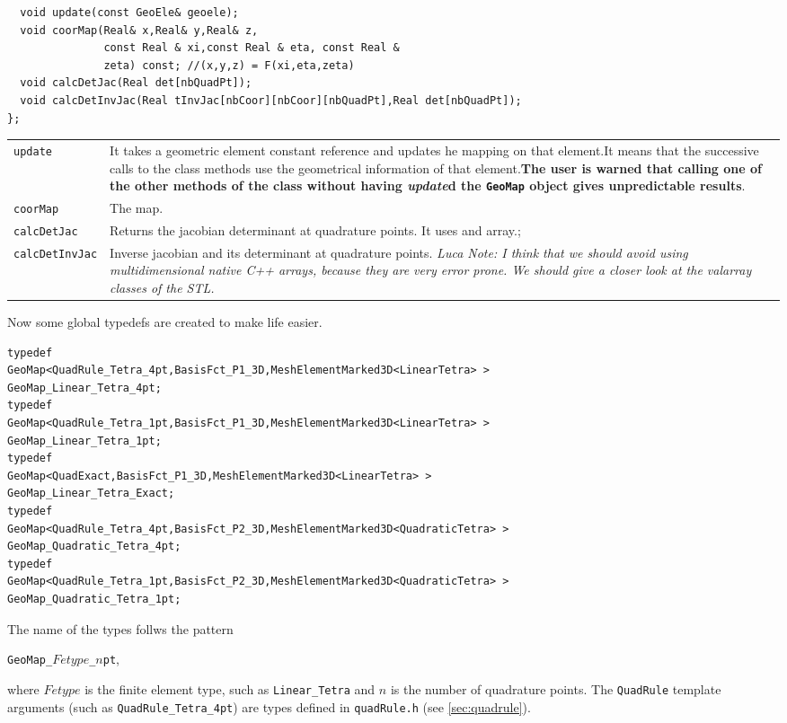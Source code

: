 \begin{verbatim}
  void update(const GeoEle& geoele);
  void coorMap(Real& x,Real& y,Real& z,
               const Real & xi,const Real & eta, const Real &
               zeta) const; //(x,y,z) = F(xi,eta,zeta)
  void calcDetJac(Real det[nbQuadPt]);
  void calcDetInvJac(Real tInvJac[nbCoor][nbCoor][nbQuadPt],Real det[nbQuadPt]);
};
\end{verbatim}
\begin{tabularx}{\textwidth}{lX}
  \hline \texttt{update}& It takes a geometric element constant
  reference and updates he mapping on that element.It means that the
  successive calls to the class methods use the geometrical
  information of that element.\textbf{The user is warned that calling
    one of the other methods of the class without having
    \emph{update}d the \texttt{GeoMap} object gives unpredictable results}.\\
  \texttt{coorMap} & The map.\\
  \texttt{calcDetJac} & Returns the jacobian determinant at
  quadrature points. It uses and array.;\\
  \texttt{calcDetInvJac} & Inverse jacobian and its determinant at
  quadrature  points.  \textsl{Luca Note: I think that we should avoid using
    multidimensional native C++ arrays, because they are very error
    prone. We should give a closer look
    at the valarray classes of the STL.}\\
  \hline
\end{tabularx}
Now some global typedefs are created to make life easier.

\begin{verbatim}
typedef
GeoMap<QuadRule_Tetra_4pt,BasisFct_P1_3D,MeshElementMarked3D<LinearTetra> >
GeoMap_Linear_Tetra_4pt;
typedef
GeoMap<QuadRule_Tetra_1pt,BasisFct_P1_3D,MeshElementMarked3D<LinearTetra> >
GeoMap_Linear_Tetra_1pt;
typedef
GeoMap<QuadExact,BasisFct_P1_3D,MeshElementMarked3D<LinearTetra> >
GeoMap_Linear_Tetra_Exact;
typedef
GeoMap<QuadRule_Tetra_4pt,BasisFct_P2_3D,MeshElementMarked3D<QuadraticTetra> >
GeoMap_Quadratic_Tetra_4pt;
typedef
GeoMap<QuadRule_Tetra_1pt,BasisFct_P2_3D,MeshElementMarked3D<QuadraticTetra> >
GeoMap_Quadratic_Tetra_1pt;
\end{verbatim}
The name of the types follws the pattern
\begin{center}
\mbox{\texttt{GeoMap\_}$Fetype$\texttt{\_}$n$\texttt{pt}},
\end{center}
where $Fetype$ is the finite element type, such as \texttt{Linear\_Tetra}
and $n$ is the number of quadrature points.
The \texttt{QuadRule} template arguments (such as \texttt{QuadRule\_Tetra\_4pt})
are types defined in \texttt{quadRule.h} (see \ref{sec:quadrule}).

